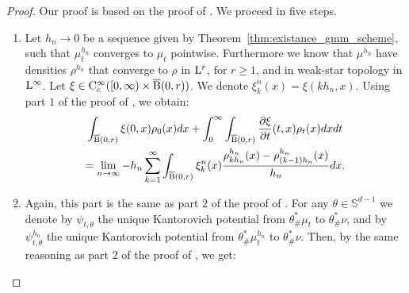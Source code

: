 \begin{proof}
Our proof is based on the proof of \cite[Theorem 5.6.1]{bonnotte2013unidimensional}. We proceed in five steps.

\begin{enumerate}[wide, labelwidth=!, labelindent=0pt,label=(\arabic*)]
\item Let $h_n \rightarrow 0$ be a sequence given by Theorem~\ref{thm:existance_gmm_scheme}, such that $\mu_t^{h_n}$ converges to $\mu_t$ pointwise. Furthermore we know that $\mu^{h_n}$ have densities $\rho^{h_n}$ that converge to $\rho$ in $\mathrm{L}^r$, for $r \geq 1$, and in weak-star topology in $\mathrm{L}^{\infty}$. Let $\xi \in \mathrm{C}_c^{\infty} ([0, \infty) \times \operatorname{\overline{B}}(0,r))$. We denote $\xi_{k}^n(x)  = \xi(kh_n, x)$. Using part $1$ of the proof of  \cite[Theorem 5.6.1]{bonnotte2013unidimensional}, we obtain:
\begin{multline} \label{thm:cont_proof_part1}
\int_{\operatorname{\overline{B}}(0,r)} \xi(0, x) \rho_0(x) dx + \int_0^{\infty} \int_{\operatorname{\overline{B}}(0,r)} \frac{\partial \xi}{\partial t}(t,x) \rho_t(x) dx dt \\
= \lim_{n \rightarrow \infty} - h_n \sum_{k=1}^{\infty} \int_{\operatorname{\overline{B}}(0,r)} \xi_k^n(x) \frac{\rho_{kh_n}^{h_n}(x) - \rho_{(k-1)h_n}^{h_n}(x) }{h_n} dx.
\end{multline}
\item Again, this part is the same as part $2$ of the proof of  \cite[Theorem 5.6.1]{bonnotte2013unidimensional}. For any $\theta \in \mathbb{S}^{d-1}$ we denote by $\psi_{t, \theta}$ the unique Kantorovich potential from $\theta_{\#}^{*}\mu_t$ to $\theta_{\#}^{*}\nu$, and by $\psi_{t, \theta}^{h_n}$ the unique Kantorovich potential from $\theta_{\#}^{*} \mu_t^{h_n}$ to $\theta_{\#}^{*} \nu$. Then, by the same reasoning as part $2$ of the proof of  \cite[Theorem 5.6.1]{bonnotte2013unidimensional}, we get:


\end{enumerate}
\end{proof}
